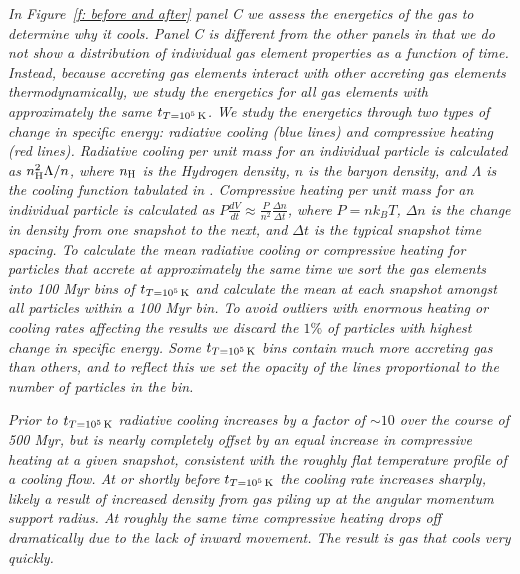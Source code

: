\documentclass[fleqn,usenatbib]{mnras}
\newcommand{\tcon}{t_{T=10^5\,{\rm K}}}
\newcommand{\nH}{n_{\rm H}}
\begin{document}
\textit{
In Figure~\ref{f: before and after} panel C we assess the energetics of the gas to determine why it cools.
Panel C is different from the other panels in that we do not show a distribution of individual gas element properties as a function of time.
Instead, because accreting gas elements interact with other accreting gas elements thermodynamically, we study the energetics for all gas elements with approximately the same $\tcon$.
We study the energetics through two types of change in specific energy: radiative cooling (blue lines) and compressive heating (red lines).
Radiative cooling per unit mass for an individual particle is calculated as $\nH^2 \Lambda / n$, where $\nH$ is the Hydrogen density, $n$ is the baryon density, and $\Lambda$ is the cooling function tabulated in \cite{Wiersma2009a}.
Compressive heating per unit mass for an individual particle is calculated as $P \frac{dV}{dt} \approx \frac{ P }{ n^2 } \frac{ \Delta n }{ \Delta t }$, where $P = n k_B T$, $\Delta n$ is the change in density from one snapshot to the next, and $\Delta t$ is the typical snapshot time spacing.
To calculate the mean radiative cooling or compressive heating for particles that accrete at approximately the same time we sort the gas elements into 100 Myr bins of $\tcon$ and calculate the mean at each snapshot amongst all particles within a 100 Myr bin.
To avoid outliers with enormous heating or cooling rates affecting the results we discard the $1\%$ of particles with highest change in specific energy.
Some $\tcon$ bins contain much more accreting gas than others, and to reflect this we set the opacity of the lines proportional to the number of particles in the bin.
}

\textit{
Prior to $\tcon$ radiative cooling increases by a factor of $\sim 10$ over the course of 500 Myr, but is nearly completely offset by an equal increase in compressive heating at a given snapshot, consistent with the roughly flat temperature profile of a cooling flow.
At or shortly before $\tcon$ the cooling rate increases sharply, likely a result of increased density from gas piling up at the angular momentum support radius.
At roughly the same time compressive heating drops off dramatically due to the lack of inward movement.
The result is gas that cools very quickly.
}
\end{document}
